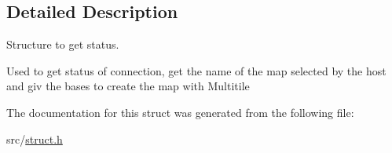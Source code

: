 \subsection{Detailed Description}
Structure to get status. 

Used to get status of connection, get the name of the map selected by the host and giv the bases to create the map with Multitile 

The documentation for this struct was generated from the following file\+:\begin{DoxyCompactItemize}
\item 
src/\hyperlink{struct_8h}{struct.\+h}\end{DoxyCompactItemize}
